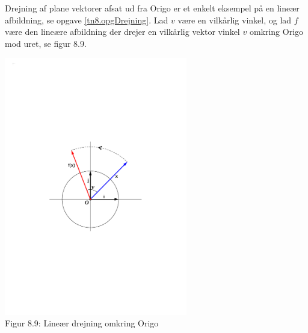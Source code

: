 \begin{example} \label{tn8.brugAfbM3}
Drejning af plane vektorer afsat ud fra Origo er et enkelt eksempel på en lineær afbildning, se opgave \ref{tn8.opgDrejning}. Lad $v$ være en vilkårlig vinkel, og lad $f$ være den lineære afbildning der drejer en vilkårlig vektor vinkel $v$ omkring Origo mod uret, se figur 8.9.
\begin{center}
		\includegraphics[trim=2cm 9cm 2cm
 9cm,width=0.60\textwidth,clip]{drejning.pdf}
  \\Figur 8.9: Lineær drejning omkring Origo 
\end{center}


\end{example}
